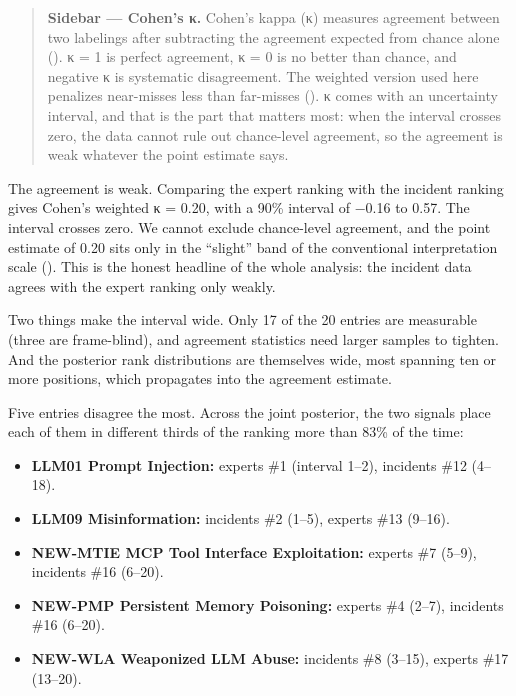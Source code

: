\documentclass[11pt]{article}
\providecommand{\tightlist}{%
  \setlength{\itemsep}{0pt}\setlength{\parskip}{0pt}}
\begin{document}
\begin{quote}
\textbf{Sidebar --- Cohen's κ.} Cohen's kappa (κ) measures agreement
between two labelings after subtracting the agreement expected from
chance alone (). κ = 1 is perfect
agreement, κ = 0 is no better than chance, and negative κ is systematic
disagreement. The weighted version used here penalizes near-misses less
than far-misses (). κ comes with an
uncertainty interval, and that is the part that matters most: when the
interval crosses zero, the data cannot rule out chance-level agreement,
so the agreement is weak whatever the point estimate says.
\end{quote}

The agreement is weak. Comparing the expert ranking with the incident
ranking gives Cohen's weighted κ = 0.20, with a 90\% interval of −0.16
to 0.57. The interval crosses zero. We cannot exclude chance-level
agreement, and the point estimate of 0.20 sits only in the ``slight''
band of the conventional interpretation scale
(). This is the honest
headline of the whole analysis: the incident data agrees with the expert
ranking only weakly.

Two things make the interval wide. Only 17 of the 20 entries are
measurable (three are frame-blind), and agreement statistics need larger
samples to tighten. And the posterior rank distributions are themselves
wide, most spanning ten or more positions, which propagates into the
agreement estimate.

Five entries disagree the most. Across the joint posterior, the two
signals place each of them in different thirds of the ranking more than
83\% of the time:

\begin{itemize}
\tightlist
\item
  \textbf{LLM01 Prompt Injection:} experts \#1 (interval 1--2),
  incidents \#12 (4--18).
\item
  \textbf{LLM09 Misinformation:} incidents \#2 (1--5), experts \#13
  (9--16).
\item
  \textbf{NEW-MTIE MCP Tool Interface Exploitation:} experts \#7 (5--9),
  incidents \#16 (6--20).
\item
  \textbf{NEW-PMP Persistent Memory Poisoning:} experts \#4 (2--7),
  incidents \#16 (6--20).
\item
  \textbf{NEW-WLA Weaponized LLM Abuse:} incidents \#8 (3--15), experts
  \#17 (13--20).
\end{itemize}
\end{document}
